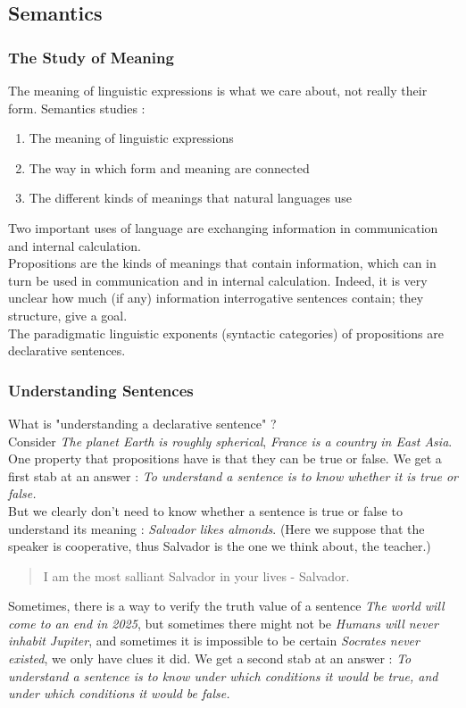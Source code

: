 \documentclass{cours}
\begin{document}
\subsection{Semantics}
\subsubsection{The Study of Meaning}
The meaning of linguistic expressions is what we care about, not really their form. Semantics studies\! :
\begin{enumerate}
    \item The meaning of linguistic expressions
    \item The way in which form and meaning are connected
    \item The different kinds of meanings that natural languages use
\end{enumerate}
Two important uses of language are exchanging information in communication and internal calculation.\\
Propositions are the kinds of meanings that contain information, which can in turn be used in communication and in internal calculation. Indeed, it is very unclear how much (if any) information interrogative sentences contain; they structure, give a goal. \\
The paradigmatic linguistic exponents (syntactic categories) of propositions are declarative sentences.

\subsubsection{Understanding Sentences}
What is "understanding a declarative sentence" ?\\

Consider \textsl{The planet Earth is roughly spherical}, \textsl{France is a country in East Asia}. One property that propositions have is that they can be true or false. We get a first stab at an answer\! : \textit{To understand a sentence is to know whether it is true or false.}\\

But we clearly don't need to know whether a sentence is true or false to understand its meaning\! : \textit{Salvador likes almonds}. (Here we suppose that the speaker is cooperative, thus Salvador is the one we think about, the teacher.)
\begin{quotation}
    I am the most salliant Salvador in your lives - Salvador.
\end{quotation}
Sometimes, there is a way to verify the truth value of a sentence \textsl{The world will come to an end in 2025}, but sometimes there might not be \textsl{Humans will never inhabit Jupiter}, and sometimes it is impossible to be certain \textsl{Socrates never existed}, we only have clues it did. We get a second stab at an answer\! : \textit{To understand a sentence is to know under which conditions it would be true, and under which conditions it would be false.}\\
\end{document}
